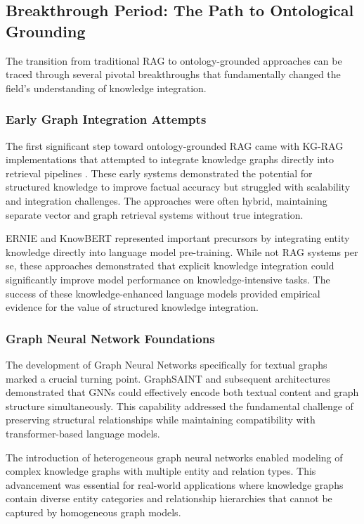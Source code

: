 \subsection{Breakthrough Period: The Path to Ontological Grounding}

The transition from traditional RAG to ontology-grounded approaches can be traced through several pivotal breakthroughs that fundamentally changed the field's understanding of knowledge integration.

\subsubsection{Early Graph Integration Attempts}

The first significant step toward ontology-grounded RAG came with KG-RAG implementations that attempted to integrate knowledge graphs directly into retrieval pipelines \cite{yu2022kg}. These early systems demonstrated the potential for structured knowledge to improve factual accuracy but struggled with scalability and integration challenges. The approaches were often hybrid, maintaining separate vector and graph retrieval systems without true integration.

ERNIE \cite{zhang2019ernie} and KnowBERT \cite{peters2019knowledge} represented important precursors by integrating entity knowledge directly into language model pre-training. While not RAG systems per se, these approaches demonstrated that explicit knowledge integration could significantly improve model performance on knowledge-intensive tasks. The success of these knowledge-enhanced language models provided empirical evidence for the value of structured knowledge integration.

\subsubsection{Graph Neural Network Foundations}

The development of Graph Neural Networks specifically for textual graphs marked a crucial turning point. GraphSAINT \cite{zeng2019graphsaint} and subsequent architectures demonstrated that GNNs could effectively encode both textual content and graph structure simultaneously. This capability addressed the fundamental challenge of preserving structural relationships while maintaining compatibility with transformer-based language models.

The introduction of heterogeneous graph neural networks \cite{wang2019heterogeneous} enabled modeling of complex knowledge graphs with multiple entity and relation types. This advancement was essential for real-world applications where knowledge graphs contain diverse entity categories and relationship hierarchies that cannot be captured by homogeneous graph models.

